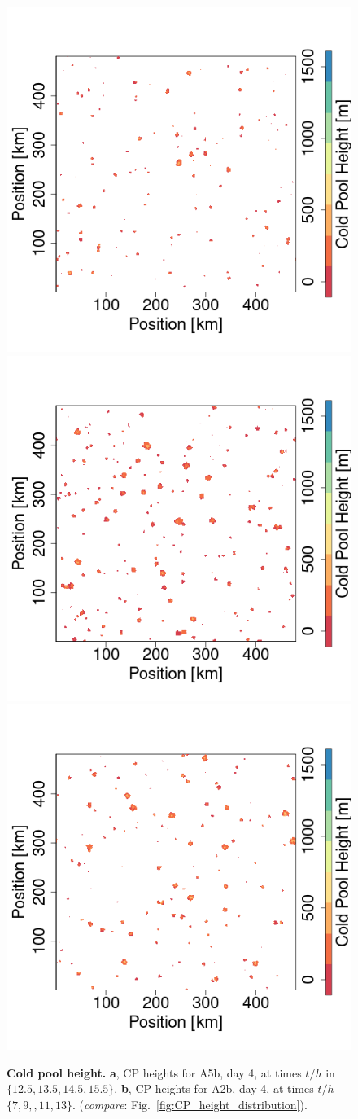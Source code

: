 \documentclass[draft,linenumbers]{agujournal2019}
\begin{document}
\begin{figure}[ht]
\includegraphics[trim={2.5cm 0 2.6cm 0},clip,height=.3\linewidth]{T0_300K_ampl_4_1km_865-1172sequence_CPheight_109.png}
\includegraphics[trim={2.5cm 0 2.6cm 0},clip,height=.3\linewidth]{T0_300K_ampl_4_1km_865-1172sequence_CPheight_133.png}
\includegraphics[trim={2.5cm 0 0 0},clip,height=.3\linewidth]{T0_300K_ampl_4_1km_865-1172sequence_CPheight_157.png}
\vspace{0cm}
\caption{{\bf Cold pool height.}
{\bf a}, CP heights for A5b, day 4, at times $t/h$ in $\{12.5, 13.5, 14.5, 15.5\}$. 
{\bf b}, CP heights for A2b, day 4, at times $t/h$ $\{7, 9,, 11, 13\}$. ({\it compare}: Fig.~\ref{fig:CP_height_distribution}).
}
\label{fig:CP_heights_space}
\end{figure}
\end{document}

